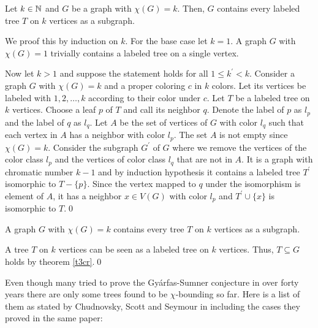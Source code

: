 \begin{thm}\label{t3cr}
Let $k\in\mathbb{N}$ and $G$ be a graph with $\chi (G) = k$. Then, $G$ contains every labeled tree $T$ on $k$ vertices as a subgraph. 
\end{thm}
\begin{prf}
We proof this by induction on $k$. For the base case let $k=1$. A graph $G$ with $\chi (G)=1$ trivially contains a labeled tree on a single vertex.

Now let $k>1$ and suppose the statement holds for all $1\leq k^\prime <k$. Consider a graph $G$ with $\chi (G) = k$ and a proper coloring $c$ in $k$ colors. Let its vertices be labeled with $1, 2, \dots , k$ according to their color under $c$. Let $T$ be a labeled tree on $k$ vertices. Choose a leaf $p$ of $T$ and call its neighbor $q$. Denote the label of $p$ as $l_p$ and the label of $q$ as $l_q$. Let $A$ be the set of vertices of $G$ with color $l_q$ such that each vertex in $A$ has a neighbor with color $l_p$. The set $A$ is not empty since $\chi (G)=k$. Consider the subgraph $G^\prime$ of $G$ where we remove the vertices of the color class $l_p$ and the vertices of color class $l_q$ that are not in $A$. It is a graph with chromatic number $k-1$ and by induction hypothesis it contains a labeled tree $T^\prime$ isomorphic to $T-\lbrace p\rbrace$. Since the vertex mapped to $q$ under the isomorphism is element of $A$, it has a neighbor $x\in V(G)$ with color $l_p$ and $T^\prime\cup\lbrace x\rbrace$ is isomorphic to $T$.\qed
\end{prf}
\begin{cor}
A graph $G$ with $\chi (G) = k$ contains every tree $T$ on $k$ vertices as a subgraph. 
\end{cor}
\begin{prf}
A tree $T$ on $k$ vertices can be seen as a labeled tree on $k$ vertices. Thus, $T\subseteq G$ holds by theorem \ref{t3cr}.\qed
\end{prf}
Even though many tried to prove the Gyárfas-Sumner conjecture in over forty years there are only some trees found to be $\chi$-bounding so far. Here is a list of them as stated by Chudnovsky, Scott and Seymour in \cite{CSP17} including the cases they proved in the same paper:

